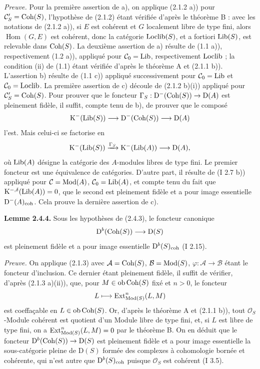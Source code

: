 \documentclass[11pt]{article}
\begin{document}
\emph{Preuve.} Pour la première assertion de a), on applique (2.1.2 a)) pour $\mathcal C'_S=\operatorname{Coh}(S)$, l'hypothèse de (2.1.2) étant vérifiée d'après le théorème B : avec les notations de (2.1.2 a)), si $E$ est cohérent et $G$ localement libre de type fini, alors $\operatorname{Hom}(G,E)$ est cohérent, donc la catégorie $\operatorname{Loclib}(S)$, et a fortiori $\operatorname{Lib}(S)$, est relevable dans $\operatorname{Coh}(S)$. La deuxième assertion de a) résulte de (1.1 a)), respectivement (1.2 a)), appliqué pour $\mathcal C_0=\operatorname{Lib}$, respectivement $\operatorname{Loclib}$ ; la condition (ii) de (1.1) étant vérifiée d'après le théorème A et (2.1.1 b)). L'assertion b) résulte de (1.1 c)) appliqué successivement pour $\mathcal C_0=\operatorname{Lib}$ et $\mathcal C_0=\operatorname{Loclib}$. La première assertion de c) découle de (2.1.2 b)(i)) appliqué pour $\mathcal C'_S=\operatorname{Coh}(S)$. Pour prouver que le foncteur $\Gamma_S:\mathrm D^{-}(\operatorname{Coh}(S))\to\mathrm D(A)$ est pleinement fidèle, il suffit, compte tenu de b), de prouver que le composé
\[
\mathrm K^{-}(\operatorname{Lib}(S))\longrightarrow\mathrm D^{-}(\operatorname{Coh}(S))\longrightarrow\mathrm D(A)
\]
l'est. Mais celui-ci se factorise en
\[
\mathrm K^{-}(\operatorname{Lib}(S))\xrightarrow{\Gamma_S}\mathrm K^{-}(\operatorname{Lib}(A))\longrightarrow\mathrm D(A),
\]
où $\operatorname{Lib}(A)$ désigne la catégorie des $A$-modules libres de type fini. Le premier foncteur est une équivalence de catégories. D'autre part, il résulte de (I 2.7 b)) appliqué pour $\mathcal C=\operatorname{Mod}(A)$, $\mathcal C_0=\operatorname{Lib}(A)$, et compte tenu du fait que $\mathrm K^{-,\delta}(\operatorname{Lib}(A))=0$, que le second est pleinement fidèle et a pour image essentielle $\mathrm D^{-}(A)_{\operatorname{coh}}$. Cela prouve la dernière assertion de c).

\textbf{Lemme 2.4.4.} Sous les hypothèses de (2.4.3), le foncteur canonique
\[
\mathrm D^b(\operatorname{Coh}(S))\longrightarrow\mathrm D(S)
\]
est pleinement fidèle et a pour image essentielle $\mathrm D^b(S)_{\operatorname{coh}}$ (I 2.15).

\emph{Preuve.} On applique (2.1.3) avec $\mathcal A=\operatorname{Coh}(S)$, $\mathcal B=\operatorname{Mod}(S)$, $\varphi:\mathcal A\to\mathcal B$ étant le foncteur d'inclusion. Ce dernier étant pleinement fidèle, il suffit de vérifier, d'après (2.1.3 a)(ii)), que, pour $M\in\operatorname{ob}\operatorname{Coh}(S)$ fixé et $n>0$, le foncteur
\[
L\longmapsto \operatorname{Ext}^n_{\operatorname{Mod}(S)}(L,M)
\]
est coeffaçable en $L\in\operatorname{ob}\operatorname{Coh}(S)$. Or, d'après le théorème A et (2.1.1 b)), tout $\mathcal O_S$-Module cohérent est quotient d'un Module libre de type fini, et, si $L$ est libre de type fini, on a $\operatorname{Ext}^n_{\operatorname{Mod}(S)}(L,M)=0$ par le théorème B. On en déduit que le foncteur $\mathrm D^b(\operatorname{Coh}(S))\to\mathrm D(S)$ est pleinement fidèle et a pour image essentielle la sous-catégorie pleine de $\mathrm D(S)$ formée des complexes à cohomologie bornée et cohérente, qui n'est autre que $\mathrm D^b(S)_{\operatorname{coh}}$ puisque $\mathcal O_S$ est cohérent (I 3.5).
\end{document}
